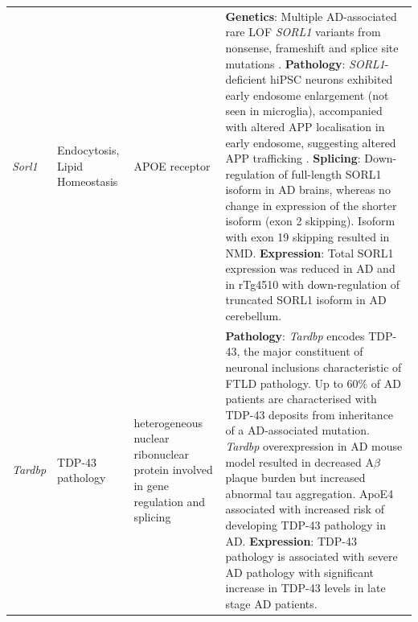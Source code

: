 \begin{landscape}
\begin{longtable}[c]{p{1cm}p{2cm}p{4cm}p{19cm}}
			\centering \textit{Sorl1} &
			\centering Endocytosis, Lipid Homeostasis  &
			\centering APOE receptor &
			\tabitem \textbf{Genetics}: Multiple AD-associated rare LOF \textit{SORL1} variants from nonsense, frameshift and splice site mutations \cite{Fernandez2016}. \newline
			\tabitem \textbf{Pathology}: \textit{SORL1}-deficient hiPSC neurons exhibited early endosome enlargement (not seen in microglia), accompanied with altered APP localisation in early endosome, suggesting altered APP trafficking \cite{Knupp2020}.\newline
			\tabitem \textbf{Splicing}: Down-regulation of full-length SORL1 isoform in AD brains, whereas no change in expression of the shorter isoform (exon 2 skipping). Isoform with exon 19 skipping resulted in NMD\cite{Grear2009}. \newline 
			\tabitem \textbf{Expression}: Total SORL1 expression was reduced in AD and in rTg4510\cite{Sobue2021} with down-regulation of truncated SORL1 isoform in AD cerebellum. \cite{Monti2021}\\
			\hdashline[0.5pt/5pt]	
			
			\centering \textit{Tardbp} &
			\centering TDP-43 pathology  &
			\centering heterogeneous nuclear ribonuclear protein involved in gene regulation and splicing &			
			\tabitem  \textbf{Pathology}: \textit{Tardbp} encodes TDP-43, the major constituent of neuronal inclusions characteristic of FTLD pathology\cite{Brouwers2010}. \newline 
			\tabitem Up to 60\% of AD patients are characterised with TDP-43 deposits from inheritance of a AD-associated mutation.\cite{Brouwers2010} \newline   
			\tabitem \textit{Tardbp} overexpression in AD mouse model resulted in decreased A$\beta$ plaque burden but increased abnormal tau aggregation.\cite{Davis2017}   \newline
			\tabitem ApoE4 associated with increased risk of developing TDP-43 pathology in AD.  \newline
			\tabitem \textbf{Expression}: TDP-43 pathology is associated with severe AD pathology with significant increase in TDP-43 levels in late stage AD patients.\cite{Herman2011} \\	
						

\end{longtable}
\end{landscape}
